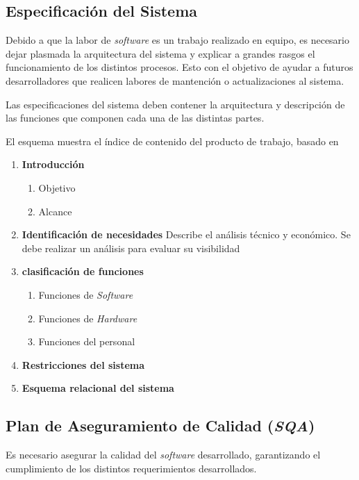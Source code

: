 \subsection{Especificación del Sistema}

Debido a que la labor de \textit{software} es un trabajo realizado en equipo, es necesario dejar plasmada la arquitectura del sistema y explicar a grandes rasgos el funcionamiento de los distintos procesos. Esto con el objetivo de ayudar a futuros desarrolladores que realicen labores de mantención o actualizaciones al sistema.

Las especificaciones del sistema deben contener la arquitectura y descripción de las funciones que componen cada una de las distintas partes.

El esquema muestra el índice de contenido del producto de trabajo, basado en \citet{mem00}

\begin{framed}
     \begin{enumerate}
		\item \textbf{Introducción}
		\begin{enumerate}
			\item Objetivo
			\item Alcance 
		\end{enumerate}
		\item \textbf{Identificación de necesidades}
		Describe el análisis técnico y económico. Se debe realizar un análisis para evaluar su visibilidad	
		\item \textbf{clasificación de funciones}
		\begin{enumerate}
			\item Funciones de \textit{Software}
			\item Funciones de \textit{Hardware}
			\item Funciones del personal
		\end{enumerate}		
		\item \textbf{Restricciones del sistema}
		\item \textbf{Esquema relacional del sistema}
	\end{enumerate}
\end{framed}

\subsection{Plan de Aseguramiento de Calidad (\textit{SQA})}
Es necesario asegurar la calidad del \textit{software} desarrollado, garantizando el cumplimiento de los distintos requerimientos desarrollados.

